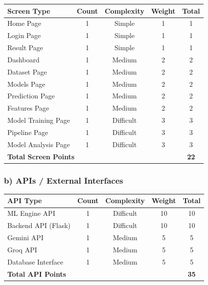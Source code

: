 \begin{table}[H]
    \centering
    \begin{tabular}{|l|c|c|c|c|}
    \hline
    \textbf{Screen Type} & \textbf{Count} & \textbf{Complexity} & \textbf{Weight} & \textbf{Total} \\ \hline
    Home Page & 1 & Simple & 1 & 1 \\ \hline
    Login Page & 1 & Simple & 1 & 1 \\ \hline
    Result Page & 1 & Simple & 1 & 1 \\ \hline
    Dashboard & 1 & Medium & 2 & 2 \\ \hline
    Dataset Page & 1 & Medium & 2 & 2 \\ \hline
    Models Page & 1 & Medium & 2 & 2 \\ \hline
    Prediction Page & 1 & Medium & 2 & 2 \\ \hline
    Features Page & 1 & Medium & 2 & 2 \\ \hline
    Model Training Page & 1 & Difficult & 3 & 3 \\ \hline
    Pipeline Page & 1 & Difficult & 3 & 3 \\ \hline
    Model Analysis Page & 1 & Difficult & 3 & 3 \\ \hline
    \multicolumn{4}{|l|}{\textbf{Total Screen Points}} & \textbf{22} \\ \hline
    \end{tabular}
\end{table}

\subsubsection*{b) APIs / External Interfaces}
\begin{table}[H]
    \centering
    \begin{tabular}{|l|c|c|c|c|}
    \hline
    \textbf{API Type} & \textbf{Count} & \textbf{Complexity} & \textbf{Weight} & \textbf{Total} \\ \hline
    ML Engine API & 1 & Difficult & 10 & 10 \\ \hline
    Backend API (Flask) & 1 & Difficult & 10 & 10 \\ \hline
    Gemini API & 1 & Medium & 5 & 5 \\ \hline
    Groq API & 1 & Medium & 5 & 5 \\ \hline
    Database Interface & 1 & Medium & 5 & 5 \\ \hline
    \multicolumn{4}{|l|}{\textbf{Total API Points}} & \textbf{35} \\ \hline
    \end{tabular}
\end{table}

